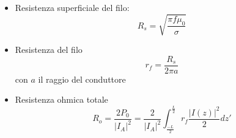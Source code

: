 \begin{itemize}
\begin{esp}
        &=  =  
      \end{esp}
    \item Resistenza superficiale del filo:
        \begin{equation}
          R_s = \sqrt{\frac{\pi f \mu_0}{\sigma}}
        \end{equation}
    \item Resistenza del filo
      \begin{equation}
        r_f = \frac{R_s}{2\pi a}
      \end{equation}
      con $a$ il raggio del conduttore
    \item Resistenza ohmica totale
      \begin{equation}
        R_o = \frac{2 P_0}{\left |I_A \right |^{2}} = \frac{2}{\left |I_A \right |^{2}} \int_{\frac{-L}{2}}^{\frac{L}{2}} r_f \frac{\left |I(z) \right |^{2}}{2}dz'
      \end{equation}
\end{itemize}
